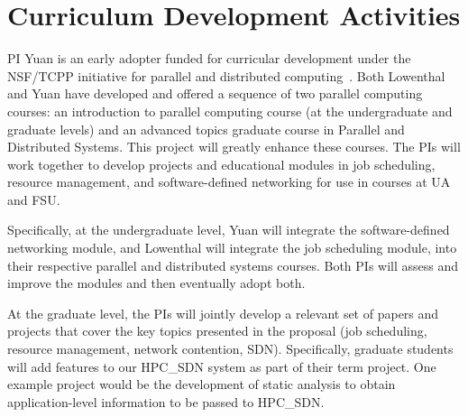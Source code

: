 \section{Curriculum Development Activities}


PI Yuan is an early adopter funded for curricular 
development under the NSF/TCPP initiative for parallel and distributed
computing~\cite{TCPP}.
Both Lowenthal and Yuan have developed and offered 
a sequence of two parallel computing courses: an introduction to
parallel computing course (at the undergraduate and graduate levels)
and an advanced topics graduate course in
Parallel and Distributed Systems.
This project will greatly enhance these courses.
The PIs will work together to develop projects and educational modules
in job scheduling, resource management, and software-defined networking
for use in courses at UA and FSU.

Specifically, at the undergraduate level, 
Yuan will integrate the software-defined networking
module, and Lowenthal will integrate the job scheduling module, into
their respective parallel and distributed systems courses.
Both PIs will assess and improve the modules and then
eventually adopt both.

\iffalse
At the graduate level, the PIs will jointly develop a relevant set of
papers that cover the key topics presented in the proposal (job
scheduling, resource management, network contention, SDN).  These
papers will
be combined with a large project that will be based on the HPC\_SDN
system described in this proposal.  Specifically, graduate students
will add features to our system as part of their term project.  One
example would be the development of static analysis to obtain
application-level information to be passed to HPC\_SDN---this is not
covered in our proposal, but would be itself an interesting line of
work.
\fi

At the graduate level, the PIs will jointly develop a relevant set of
papers and projects that cover the key topics presented in the proposal (job
scheduling, resource management, network contention, SDN).
Specifically, graduate students
will add features to our HPC\_SDN system as part of their term project.  One
example project would be the development of static analysis to obtain 
application-level information to be passed to HPC\_SDN.

